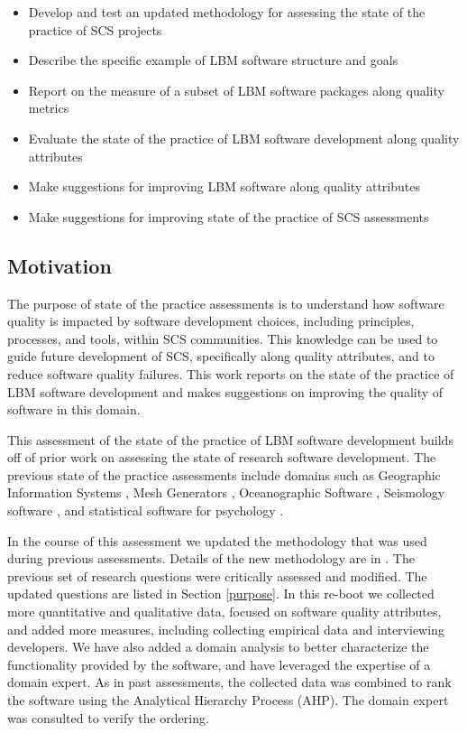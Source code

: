 \documentclass[12pt, notitlepage]{article}
\begin{document}
\begin{itemize}
	\item Develop and test an updated methodology for assessing the state of the practice of SCS projects
	\item Describe the specific example of LBM software structure and goals
	\item Report on the measure of a subset of LBM software packages along quality metrics
	\item Evaluate the state of the practice of LBM software development along quality attributes
	\item Make suggestions for improving LBM software along quality attributes
	\item Make suggestions for improving state of the practice of SCS assessments
\end{itemize}

\subsection{Motivation}

The purpose of state of the practice assessments is to understand how software quality is impacted by software development choices, including principles, processes, and tools, within SCS communities. This knowledge can be used to guide future development of SCS, specifically along quality attributes, and to reduce software quality failures. This work reports on the state of the practice of LBM software development and makes suggestions on improving the quality of software in this domain.

This assessment of the state of the practice of LBM software development builds off of prior work on assessing the state of research software development. The previous state of the practice assessments include domains such as Geographic Information Systems \citep{SmithEtAl2018_arXivGIS}, Mesh Generators \citep{SmithEtAl2016}, Oceanographic Software \citep{smith2015state}, Seismology software \citep{SmithEtAl2018}, and statistical software for psychology \citep{SmithEtAl2018_StatSoft}. 

In the course of this assessment we updated the methodology that was used during previous assessments. Details of the new methodology are in \citep{methodology2020}. The previous set of research questions were critically assessed and modified. The updated questions are listed in Section \ref{purpose}. In this re-boot we collected more quantitative and qualitative data, focused on software quality attributes, and added more measures, including collecting empirical data and interviewing developers. We have also added a domain analysis to better characterize the functionality provided by the software, and have leveraged the expertise of a domain expert. As in past assessments, the collected data was combined to rank the software using the Analytical Hierarchy Process (AHP). The domain expert was consulted to verify the ordering.
\end{document}
